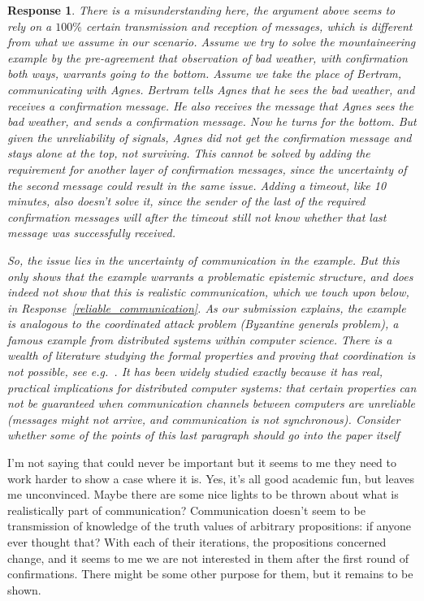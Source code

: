 \documentclass[a4paper]{article}
\newtheorem{response}{Response}
\newenvironment{tobo}{\smallskip \noindent \color{yellow!80!black!80}}{\color{black}\smallskip}
\begin{document}
\begin{response}
There is a misunderstanding here, the argument above seems to rely on a $100\% $ certain transmission and reception of messages, which is different from what we assume in our scenario. Assume we try to solve the mountaineering example by the pre-agreement that observation of bad weather, with confirmation both ways, warrants going to the bottom. Assume we take the place of Bertram, communicating with Agnes. Bertram tells Agnes that he sees the bad weather, and receives a confirmation message. He also receives the message that Agnes sees the bad weather, and sends a confirmation message. Now he turns for the bottom. But given the unreliability of signals, Agnes did not get the confirmation message and stays alone at the top, not surviving. This cannot be solved by adding the requirement for another layer of confirmation messages, since the uncertainty of the second message could result in the same issue. Adding a timeout, like 10 minutes, also doesn't solve it, since the sender of the last of the required confirmation messages will after the timeout still not know whether that last message was successfully received. 

So, the issue lies in the uncertainty of communication in the example. But this only shows that the example warrants a problematic epistemic structure, and does indeed not show that this is realistic communication, which we touch upon below, in Response~\ref{reliable_communication}. As our submission explains, the example is analogous to the coordinated attack problem (Byzantine generals problem), a famous example from distributed systems within computer science. There is a wealth of literature studying the formal properties and proving that coordination is not possible, see e.g.~\cite{fagin1995reasoning}. It has been widely studied exactly because it has real, practical implications for distributed computer systems: that certain properties can not be guaranteed when communication channels between computers are unreliable (messages might not arrive, and communication is not synchronous).
\begin{tobo} Consider whether some of the points of this last paragraph should go into the paper itself \end{tobo}

\end{response}

I'm not saying that could never be important but it seems to me they need to work harder to show a case where it is. Yes, it's all good academic fun, but leaves me unconvinced. Maybe there are some nice lights to be thrown about what is realistically part of communication? Communication doesn't seem to be transmission of knowledge of the truth values of arbitrary propositions: if anyone ever thought that? With each of their iterations, the propositions concerned change, and it seems to me we are not interested in them after the first round of confirmations. There might be some other purpose for them, but it remains to be shown.
\end{document}
